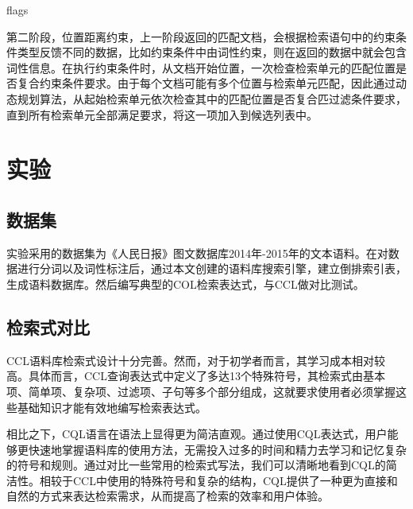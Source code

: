 \documentclass[11pt]{article}
\begin{document}
\begin{CJK*}{UTF8}{gbsn}
\begin{algorithm}[H]
	\KwRet flags\;
\end{algorithm}

第二阶段，位置距离约束，上一阶段返回的匹配文档，会根据检索语句中的约束条件类型反馈不同的数据，比如约束条件中由词性约束，则在返回的数据中就会包含词性信息。在执行约束条件时，从文档开始位置，一次检查检索单元的匹配位置是否复合约束条件要求。由于每个文档可能有多个位置与检索单元匹配，因此通过动态规划算法，从起始检索单元依次检查其中的匹配位置是否复合匹过滤条件要求，直到所有检索单元全部满足要求，将这一项加入到候选列表中。




\section{实验}

\subsection{数据集}

实验采用的数据集为《人民日报》图文数据库2014年-2015年的文本语料。在对数据进行分词以及词性标注后，通过本文创建的语料库搜索引擎，建立倒排索引表，生成语料数据库。然后编写典型的COL检索表达式，与CCL做对比测试。

\subsection{检索式对比}

CCL语料库检索式设计十分完善。然而，对于初学者而言，其学习成本相对较高。具体而言，CCL查询表达式中定义了多达13个特殊符号，其检索式由基本项、简单项、复杂项、过滤项、子句等多个部分组成，这就要求使用者必须掌握这些基础知识才能有效地编写检索表达式。

相比之下，CQL语言在语法上显得更为简洁直观。通过使用CQL表达式，用户能够更快速地掌握语料库的使用方法，无需投入过多的时间和精力去学习和记忆复杂的符号和规则。通过对比一些常用的检索式写法，我们可以清晰地看到CQL的简洁性。相较于CCL中使用的特殊符号和复杂的结构，CQL提供了一种更为直接和自然的方式来表达检索需求，从而提高了检索的效率和用户体验。


\end{CJK*}
\end{document}

